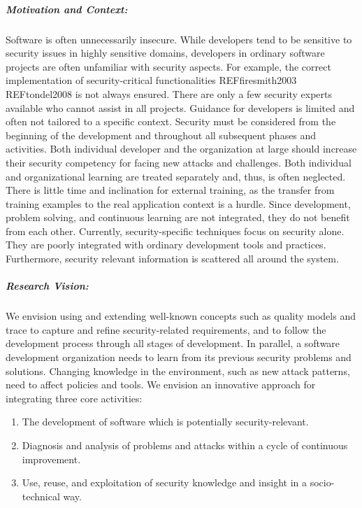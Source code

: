 
\subparagraph*{Motivation and Context:}
Software is often unnecessarily insecure. While developers tend to be sensitive to security issues in highly sensitive domains, developers in ordinary software projects are often unfamiliar with security aspects. For example, the correct implementation of security-critical functionalities REFfiresmith2003 REFtondel2008 is not always ensured. There are only a few security experts available who cannot assist in all projects. Guidance for developers is limited and often not tailored to a specific context. Security must be considered from the beginning of the development and throughout all subsequent phases and activities. Both individual developer and the organization at large should increase their security competency for facing new attacks and challenges. Both individual and organizational learning are treated separately and, thus, is often neglected. There is little time and inclination for external training, as the transfer from training examples to the real application context is a hurdle. Since development, problem solving, and continuous learning are not integrated, they do not benefit from each other. Currently, security-specific techniques focus on security alone. They are poorly integrated with ordinary development tools and practices. Furthermore, security relevant information is scattered all around the system. 

\subparagraph*{Research Vision:}
We envision using and extending well-known concepts such as quality models and trace to capture and refine security-related requirements, and to follow the development process through all stages of develop­ment. In parallel, a software development organization needs to learn from its previous security problems and solutions. Changing knowledge in the environment, such as new attack patterns, need to affect policies and tools. We envision an innovative approach for integrating three core activities:

\begin{enumerate}
    \item The development of software which is potentially security-relevant.
    \item Diagnosis and analysis of problems and attacks within a cycle of continuous improvement. 
    \item Use, reuse, and exploitation of security knowledge and insight in a socio-technical way.
\end{enumerate}

